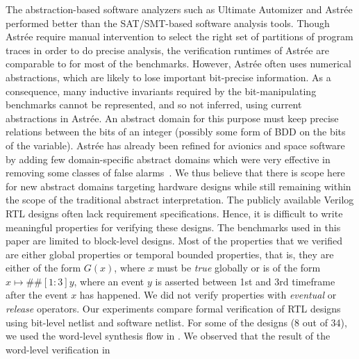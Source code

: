 %
The abstraction-based software analyzers such as Ultimate Automizer and Astr{\'e}e 
performed better than the SAT/SMT-based software analysis tools.  Though 
Astr{\'e}e require manual intervention to select the right set of partitions 
of program traces in order to do precise analysis, the verification runtimes 
of Astr{\'e}e are comparable to \ABC for most of the benchmarks.  However, 
Astr{\'e}e often uses numerical abstractions, which are likely to lose 
important bit-precise information.  
%
As a consequence, many inductive invariants required by the bit-manipulating 
benchmarks cannot be represented, and so not inferred, using current abstractions 
in Astr{\'e}e.  An abstract domain for this purpose must keep 
precise relations between the bits of an integer (possibly some 
form of BDD on the bits of the variable).  Astr{\'e}e has already been 
refined for avionics and space software by adding few domain-specific 
abstract domains which were very effective in removing some classes of 
false alarms~\cite{DBLP:journals/ftpl/BertraneCCFMMR15}.  We thus believe 
that there is scope here for new abstract domains targeting hardware 
designs while still remaining within the scope of the traditional abstract 
interpretation. 
%
%
The publicly available Verilog RTL designs often lack requirement 
specifications.  Hence, it is difficult to write meaningful 
properties for verifying these designs.  The benchmarks used 
in this paper are limited to block-level designs. 
%
Most of the properties that we verified are either global properties 
or temporal bounded properties, that is, they are either of the form 
$G(x)$, where $x$ must be \emph{true} globally or is of the form 
$x \mapsto \#\#[1:3] y$, where an event $y$ is asserted between 1st and 
3rd timeframe after the event $x$ has happened.  We did not verify 
properties with \emph{eventual} or \emph{release} operators. 
%
Our experiments compare formal verification of RTL designs using 
bit-level netlist and software netlist.  
%
For some of the designs (8 out of 34), we used the word-level synthesis 
flow in \ebmc.  
We observed that the result of the word-level verification in \ebmc 
